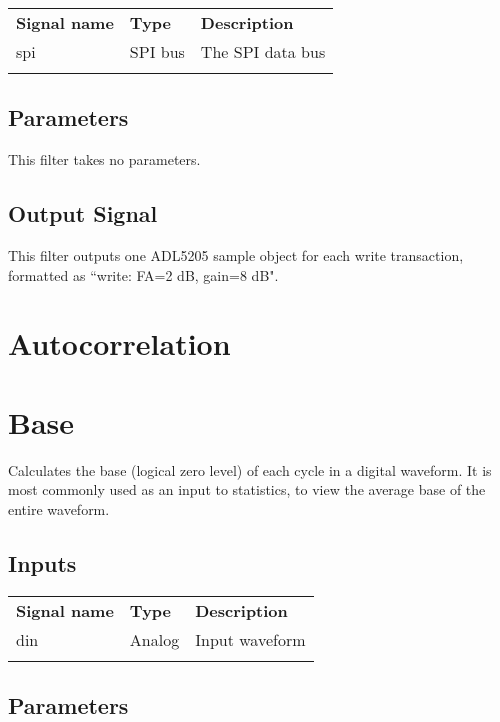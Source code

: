 \begin{tabularx}{16cm}{llX}
\thickhline
\textbf{Signal name} & \textbf{Type} & \textbf{Description} \\
\thickhline
spi & SPI bus & The SPI data bus \\
\thickhline
\end{tabularx}

\subsection{Parameters}

This filter takes no parameters.

\subsection{Output Signal}

This filter outputs one ADL5205 sample object for each write transaction, formatted as ``write: FA=2 dB, gain=8 dB".

\pagebreak
\section{Autocorrelation}

\pagebreak
\section{Base}

Calculates the base (logical zero level) of each cycle in a digital waveform. It is most commonly used as an input to
statistics, to view the average base of the entire waveform.

\subsection{Inputs}

\begin{tabularx}{16cm}{llX}
\thickhline
\textbf{Signal name} & \textbf{Type} & \textbf{Description} \\
\thickhline
din & Analog & Input waveform \\
\thickhline
\end{tabularx}

\subsection{Parameters}

